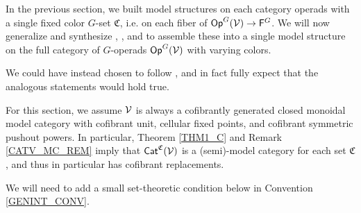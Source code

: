 \documentclass[a4paper,10pt
,draft
]{article}%
\renewcommand{\F}{\mathcal F}
\renewcommand{\1}{\eta}%
\begin{document}
In the previous section, we built model structures on each category operads with a single fixed color $G$-set $\mathfrak C$,
i.e. on each fiber of $\mathsf{Op}^G(\mathcal V) \to \mathsf{F}^G$. 
We will now generalize and synthesize \cite{BM13}, \cite{Cav}, and \cite{CM13b} to assemble these
into a single model structure on the full category of $G$-operads $\mathsf{Op}^G(\mathcal V)$ with varying colors.




\begin{remark}
      We could have instead chosen to follow \cite{Mur15}, and in fact
      fully expect that the analogous statements would hold true.
\end{remark}

\begin{convention}
      \label{ALLCOLOR_CONV}
      For this section, we assume $\mathcal V$ is always a cofibrantly generated closed monoidal model category with
      cofibrant unit, cellular fixed points, and cofibrant symmetric pushout powers.
      In particular, Theorem \ref{THM1_C} and Remark \ref{CATV_MC_REM} imply that $\mathsf{Cat}^{\mathfrak C}(\mathcal V)$ is a (semi)-model category for each set $\mathfrak C$,
      and thus in particular has cofibrant replacements.

      We will need to add a small set-theoretic condition below in Convention \ref{GENINT_CONV}.
\end{convention}


\end{document}
